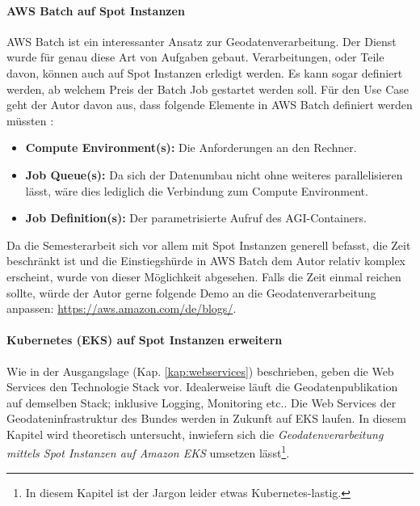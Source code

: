 \paragraph{AWS Batch auf Spot Instanzen}
AWS Batch ist ein interessanter Ansatz zur Geodatenverarbeitung. Der Dienst wurde für genau diese Art von Aufgaben gebaut. Verarbeitungen, oder Teile davon, können auch auf Spot Instanzen erledigt werden. Es kann sogar definiert werden, ab welchem Preis der Batch Job gestartet werden soll. Für den Use Case geht der Autor davon aus, dass folgende Elemente in AWS Batch definiert werden müssten \cite{Batch2020}: 
\begin{itemize}
\item{\textbf{Compute Environment(s):} Die Anforderungen an den Rechner.}
\item{\textbf{Job Queue(s):} Da sich der Datenumbau nicht ohne weiteres parallelisieren lässt, wäre dies lediglich die Verbindung zum Compute Environment.}
\item{\textbf{Job Definition(s):} Der parametrisierte Aufruf des AGI-Containers.}
\end{itemize}
Da die Semesterarbeit sich vor allem mit Spot Instanzen generell befasst, die Zeit beschränkt ist und die Einstiegshürde in AWS Batch dem Autor relativ komplex erscheint, wurde von dieser Möglichkeit abgesehen. Falls die Zeit einmal reichen sollte, würde der Autor gerne folgende Demo an die Geodatenverarbeitung anpassen:
\href{https://aws.amazon.com/de/blogs/compute/creating-a-simple-fetch-and-run-aws-batch-job/}{https://aws.amazon.com/de/blogs/}.

\paragraph{Kubernetes (EKS) auf Spot Instanzen erweitern}
Wie in der Ausgangslage (Kap. \ref{kap:webservices}) beschrieben, geben die Web Services den Technologie Stack vor. Idealerweise läuft die Geodatenpublikation auf demselben Stack; inklusive Logging, Monitoring etc.. 
Die Web Services der Geodateninfrastruktur des Bundes werden in Zukunft auf EKS laufen. In diesem Kapitel wird theoretisch untersucht, inwiefern sich die \textit{Geodatenverarbeitung mittels Spot Instanzen auf Amazon EKS} umsetzen lässt\footnote{In diesem Kapitel ist der Jargon leider etwas Kubernetes-lastig.}. 

